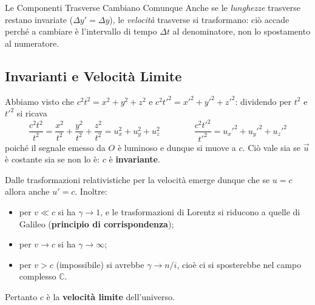 \begin{attenzione}{Le Componenti Trasverse Cambiano Comunque}
Anche se le \emph{lunghezze} trasverse restano invariate ($\Delta y' = \Delta y$), le \emph{velocità} trasverse si trasformano: ciò accade perché a cambiare è l'intervallo di tempo $\Delta t$ al denominatore, non lo spostamento al numeratore.
\end{attenzione}

\subsection{Invarianti e Velocità Limite}

Abbiamo visto che $c^2t^2 = x^2+y^2+z^2$ e $c^2t'^2 = x'^2+y'^2+z'^2$: dividendo per $t^2$ e $t'^2$ si ricava
\begin{equation}
    \frac{c^2t^2}{t^2} = \frac{x^2}{t^2} + \frac{y^2}{t^2} + \frac{z^2}{t^2} = u_x^2 + u_y^2 + u_z^2
    \qquad\qquad
    \frac{c^2t'^2}{t'^2} = u_x'^2 + u_y'^2 + u_z'^2
\end{equation}
poiché il segnale emesso da $O$ è luminoso e dunque si muove a $c$. Ciò vale sia se $\vec{u}$ è costante sia se non lo è: $c$ è \textbf{invariante}.

Dalle trasformazioni relativistiche per la velocità emerge dunque che se $u = c$ allora anche $u' = c$. Inoltre:
\begin{itemize}
    \item per $v \ll c$ si ha $\gamma \to 1$, e le trasformazioni di Lorentz si riducono a quelle di Galileo (\textbf{principio di corrispondenza});
    \item per $v \to c$ si ha $\gamma \to \infty$;
    \item per $v > c$ (impossibile) si avrebbe $\gamma \to n/i$, cioè ci si sposterebbe nel campo complesso $\mathbb{C}$.
\end{itemize}
Pertanto $c$ è la \textbf{velocità limite} dell'universo.

